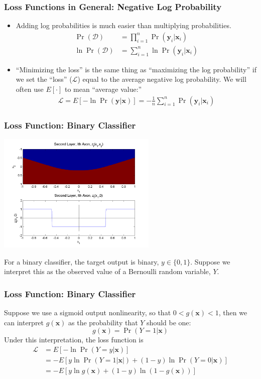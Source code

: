 \documentclass{beamer}
\begin{document}
\begin{frame}
  \frametitle{Loss Functions in General: Negative Log Probability}

  \begin{itemize}
  \item 
    Adding log
    probabilities is much easier than multiplying probabilities.
    \begin{align*}
      \Pr\left(\mathcal{D}\right) &= \prod_{i=1}^n \Pr\left(\mathbf{y}_i|\mathbf{x}_i\right)\\
      \ln\Pr\left(\mathcal{D}\right) &= \sum_{i=1}^n \ln\Pr\left(\mathbf{y}_i|\mathbf{x}_i\right)
    \end{align*}
  \item
    ``Minimizing the loss'' is the same thing as ``maximizing the
    log probability'' if we set the ``loss'' (${\mathcal L}$) equal
    to the average negative log probability.  We will often use
    $E\left[\cdot\right]$ to mean ``average value:''
    \begin{align*}
      \mathcal{L}=E\left[-\ln\Pr(\mathbf{y}|\mathbf{x})\right]=
      -\frac{1}{n}\sum_{i=1}^n\Pr(\mathbf{y}_i|\mathbf{x}_i)
    \end{align*}
  \end{itemize}
\end{frame}

\begin{frame}
  \frametitle{Loss Function: Binary Classifier}

  \centerline{\includegraphics[width=3in]{figs/nn_axon2.png}}

  For a binary classifier, the target output is binary, $y\in\{0,1\}$.
  Suppose we interpret this as the observed value of a Bernoulli
  random variable, $Y$.
\end{frame}
\begin{frame}
  \frametitle{Loss Function: Binary Classifier}
  Suppose we use a
  sigmoid output nonlinearity, so that $0<g(\mathbf{x})<1$, then we
  can interpret $g(\mathbf{x})$ as the probability that $Y$ should be
  one:
  \begin{displaymath}
    g(\mathbf{x}) = \Pr(Y=1|\mathbf{x})
  \end{displaymath}
  Under this interpretation, the loss function is
  \begin{align*}
    \mathcal{L}
    &= E\left[-\ln\Pr(Y=y|\mathbf{x})\right]\\
    &= -E\left[y\ln\Pr(Y=1|\mathbf{x|})+(1-y)\ln\Pr(Y=0|\mathbf{x})\right]\\
    &= -E\left[y\ln g(\mathbf{x})+(1-y)\ln(1-g(\mathbf{x}))\right]
  \end{align*}
\end{frame}
\end{document}
